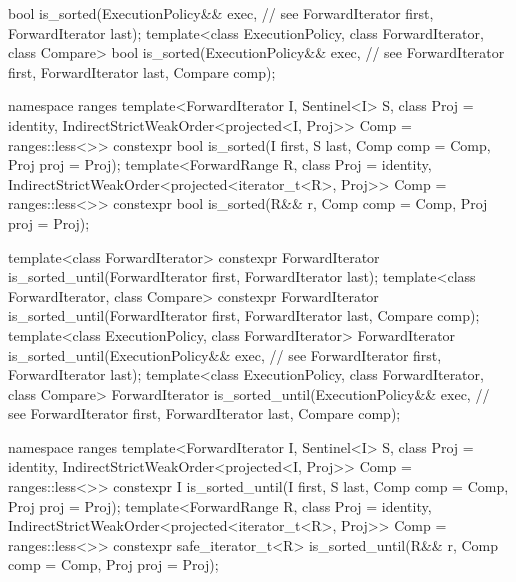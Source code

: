 \begin{codeblock}
    bool is_sorted(ExecutionPolicy&& exec, // see 
                   ForwardIterator first, ForwardIterator last);
  template<class ExecutionPolicy, class ForwardIterator, class Compare>
    bool is_sorted(ExecutionPolicy&& exec, // see 
                   ForwardIterator first, ForwardIterator last,
                   Compare comp);
\end{codeblock}\begin{addedblock}\begin{codeblock}
  namespace ranges {
    template<ForwardIterator I, Sentinel<I> S, class Proj = identity,
        IndirectStrictWeakOrder<projected<I, Proj>> Comp = ranges::less<>>
      constexpr bool is_sorted(I first, S last, Comp comp = Comp{}, Proj proj = Proj{});
    template<ForwardRange R, class Proj = identity,
        IndirectStrictWeakOrder<projected<iterator_t<R>, Proj>> Comp = ranges::less<>>
      constexpr bool is_sorted(R&& r, Comp comp = Comp{}, Proj proj = Proj{});
  }
\end{codeblock}\end{addedblock}\begin{codeblock}
  template<class ForwardIterator>
    constexpr ForwardIterator
      is_sorted_until(ForwardIterator first, ForwardIterator last);
  template<class ForwardIterator, class Compare>
    constexpr ForwardIterator
      is_sorted_until(ForwardIterator first, ForwardIterator last,
                      Compare comp);
  template<class ExecutionPolicy, class ForwardIterator>
    ForwardIterator
      is_sorted_until(ExecutionPolicy&& exec, // see 
                      ForwardIterator first, ForwardIterator last);
  template<class ExecutionPolicy, class ForwardIterator, class Compare>
    ForwardIterator
      is_sorted_until(ExecutionPolicy&& exec, // see 
                      ForwardIterator first, ForwardIterator last,
                      Compare comp);
\end{codeblock}\begin{addedblock}\begin{codeblock}
  namespace ranges {
    template<ForwardIterator I, Sentinel<I> S, class Proj = identity,
        IndirectStrictWeakOrder<projected<I, Proj>> Comp = ranges::less<>>
      constexpr I is_sorted_until(I first, S last, Comp comp = Comp{}, Proj proj = Proj{});
    template<ForwardRange R, class Proj = identity,
        IndirectStrictWeakOrder<projected<iterator_t<R>, Proj>> Comp = ranges::less<>>
      constexpr safe_iterator_t<R>
        is_sorted_until(R&& r, Comp comp = Comp{}, Proj proj = Proj{});
  }
\end{codeblock}\end{addedblock}\begin{codeblock}


\end{codeblock}

